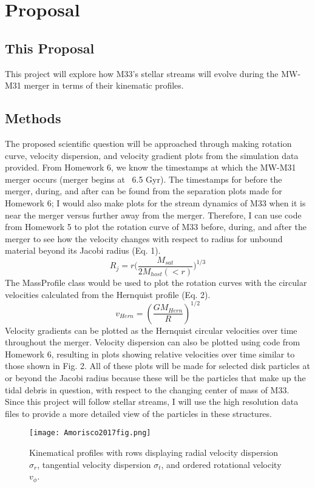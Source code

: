\documentclass[linenumbers,trackchanges]{aastex7}
\begin{document}
\section{Proposal}
\subsection{This Proposal}
This project will explore how M33's stellar streams will evolve during the MW-M31 merger in terms of their kinematic profiles.
\subsection{Methods}
The proposed scientific question will be approached through making rotation curve, velocity dispersion, and velocity gradient plots from the simulation data provided. From Homework 6, we know the timestamps at which the MW-M31 merger occurs (merger begins at ~6.5 Gyr). The timestamps for before the merger, during, and after can be found from the separation plots made for Homework 6; I would also make plots for the stream dynamics of M33 when it is near the merger versus further away from the merger. Therefore, I can use code from Homework 5 to plot the rotation curve of M33 before, during, and after the merger to see how the velocity changes with respect to radius for unbound material beyond its Jacobi radius (Eq. 1).
\begin{equation} \label{eq:1}
    R_j = r  \bigg( \frac{M_{sat}}{2 M_{host}(<r)} \bigg)^{1/3}
\end{equation}
The MassProfile class would be used to plot the rotation curves with the circular velocities calculated from the Hernquist profile (Eq. 2).
\begin{equation} \label{eq:2}
    v_{Hern} = (\frac{GM_{Hern}}{R})^{1/2}
\end{equation}
Velocity gradients can be plotted as the Hernquist circular velocities over time throughout the merger. 
Velocity dispersion can also be plotted using code from Homework 6, resulting in plots showing relative velocities over time similar to those shown in Fig. 2.
All of these plots will be made for selected disk particles at or beyond the Jacobi radius because these will be the particles that make up the tidal debris in question, with respect to the changing center of mass of M33. Since this project will follow stellar streams, I will use the high resolution data files to provide a more detailed view of the particles in these structures.
\begin{figure}[h]
\centering
    \texttt{[image: Amorisco2017fig.png]}
    \label{fig:enter-label}
    \caption{Kinematical profiles with rows displaying radial velocity dispersion $\sigma_r$, tangential velocity dispersion $\sigma_t$, and ordered rotational velocity $v_{\phi}$\citep{10.1093/mnras/stw2229}.}
\end{figure}
\end{document}
